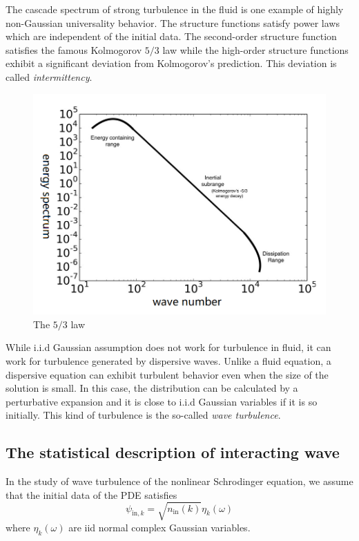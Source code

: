 The cascade spectrum of strong turbulence in the fluid is one example of highly non-Gaussian universality behavior. The structure functions satisfy power laws which are independent of the initial data. The second-order structure function satisfies the famous Kolmogorov $5/3$ law while the high-order structure functions exhibit a significant deviation from Kolmogorov's prediction. This deviation is called \textit{intermittency}. 

\begin{figure}[H]
    \centering
    \includegraphics[scale = 0.6] {introduction/five_third_law.png}
    \caption{The $5/3$ law}
    \label{fig.5/3law}
\end{figure}

While i.i.d Gaussian assumption does not work for turbulence in fluid, it can work for turbulence generated by dispersive waves. Unlike a fluid equation, a dispersive equation can exhibit turbulent behavior even when the size of the solution is small. In this case, the distribution can be calculated by a perturbative expansion and it is close to i.i.d Gaussian variables if it is so initially. This kind of turbulence is the so-called \textit{wave turbulence}.


\subsection{The statistical description of interacting wave}

In the study of wave turbulence of the nonlinear Schrodinger equation, we assume that the initial data of the PDE satisfies
\begin{equation}
\psi_{\textrm{in},k}=\sqrt{n_{\textrm{in}}(k)} \eta_k(\omega)
\end{equation}
where $\eta_k(\omega)$ are iid normal complex Gaussian variables.

